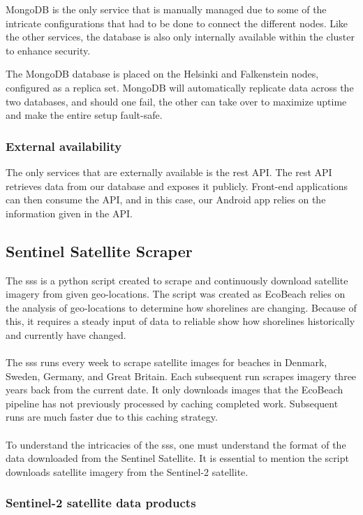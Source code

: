 MongoDB is the only service that is manually managed due to some of the intricate configurations that had to be done to connect the different nodes. Like the other services, the database is also only internally available within the cluster to enhance security. 

The MongoDB database is placed on the Helsinki and Falkenstein nodes, configured as a replica set. MongoDB will automatically replicate data across the two databases, and should one fail, the other can take over to maximize uptime and make the entire setup fault-safe. 

\subsubsection{External availability}

The only services that are externally available is the rest API. The rest API retrieves data from our database and exposes it publicly. Front-end applications can then consume the API, and in this case, our Android app relies on the information given in the API.

\subsection{Sentinel Satellite Scraper}\label{subsec:sentinel-satellite-scraper}
The \acrfull{sss} is a python script created to scrape and continuously download satellite imagery from given geo-locations. The script was created as EcoBeach relies on the analysis of geo-locations to determine how shorelines are changing. Because of this, it requires a steady input of data to reliable show how shorelines historically and currently have changed.\\\\
\noindent
The \acrshort{sss} runs every week to scrape satellite images for beaches in Denmark, Sweden, Germany, and Great Britain. Each subsequent run scrapes imagery three years back from the current date. It only downloads images that the EcoBeach pipeline has not previously processed by caching completed work. Subsequent runs are much faster due to this caching strategy. \\\\
\noindent
To understand the intricacies of the \acrshort{sss}, one must understand the format of the data downloaded from the Sentinel Satellite. It is essential to mention the script downloads satellite imagery from the Sentinel-2 satellite.

\subsubsection{Sentinel-2 satellite data products}

